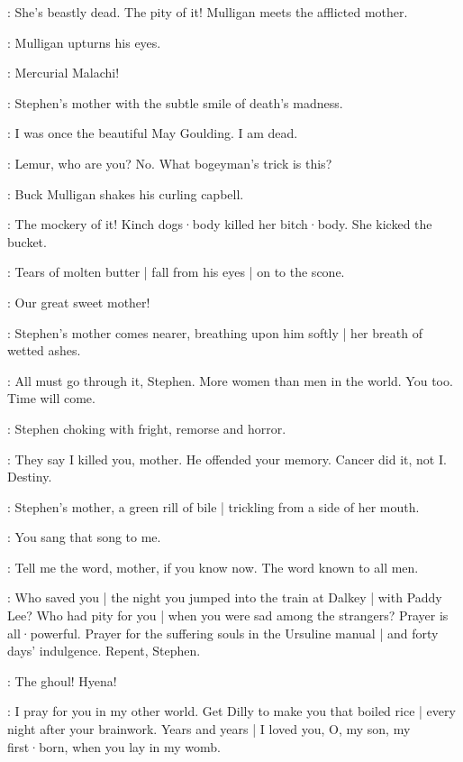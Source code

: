\BuckMulligan:
She's beastly dead.
The pity of it!
%
Mulligan meets the afflicted mother.

:
Mulligan upturns his eyes.

\BuckMulligan:
Mercurial Malachi!

:
Stephen's mother with the subtle smile of death's madness.

\Mother:
I was once the beautiful May Goulding.
I am dead.

\Stephen:
Lemur,
who are you?
No.
What bogeyman's trick is this?

:
Buck Mulligan shakes his curling capbell.

\BuckMulligan:
The mockery of it!
Kinch dogs·body killed her bitch·body.
She kicked the bucket.

:
Tears of molten butter |
fall from his eyes |
on to the scone.

\BuckMulligan:
Our great sweet mother!
%

:
Stephen's mother comes nearer,
breathing upon him softly |
her breath of wetted ashes.

\Mother:
All must go through it,
Stephen.
More women than men in the world.
You too.
Time will come.

:
Stephen choking with fright,
remorse and horror.

\Stephen:
They say I killed you,
mother.
He offended your memory.
Cancer did it,
not I.
Destiny.

:
Stephen's mother,
a green rill of bile |
trickling from a side of her mouth.

\Mother:
You sang that song to me.
%

\Stephen:
Tell me the word,
mother,
if you know now.
The word known to all men.

\Mother:
Who saved you |
the night you jumped into the train at Dalkey |
with Paddy Lee?
Who had pity for you |
when you were sad among the strangers?
Prayer is all·powerful.
Prayer for the suffering souls in the Ursuline manual |
and forty days' indulgence.
Repent,
Stephen.

\Stephen:
The ghoul!
%
Hyena!

\Mother:
I pray for you in my other world.
Get Dilly to make you that boiled rice |
every night after your brainwork.
Years and years |
I loved you,
O,
my son,
my first·born,
when you lay in my womb.

